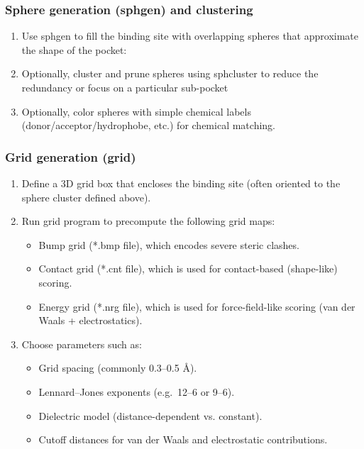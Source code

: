 \documentclass[12pt, a4paper]{article}
\begin{document}
\subsubsection{Sphere generation (sphgen) and clustering}

\begin{enumerate}
  \item Use sphgen to fill the binding site with overlapping spheres that approximate the shape of the pocket:
  \item Optionally, cluster and prune spheres using sphcluster to reduce the redundancy or focus on a particular sub-pocket
  \item Optionally, color spheres with simple chemical labels (donor/acceptor/hydrophobe, etc.) for chemical matching.
\end{enumerate}

\subsubsection{Grid generation (grid)}

\begin{enumerate}
  \item Define a 3D grid box that encloses the binding site (often oriented to the sphere cluster defined above).
  \item Run grid program to precompute the following grid maps:
        \begin{itemize}
          \item Bump grid (*.bmp file), which encodes severe steric clashes.
          \item Contact grid (*.cnt file), which is used for contact-based (shape-like) scoring.
          \item Energy grid (*.nrg file), which is used for force-field-like scoring (van der Waals + electrostatics).
        \end{itemize}

  \item Choose parameters such as:
        \begin{itemize}
          \item Grid spacing (commonly 0.3–0.5 \r{A}).
          \item Lennard–Jones exponents (e.g.\ 12–6 or 9–6).
          \item Dielectric model (distance-dependent vs. constant).
          \item Cutoff distances for van der Waals and electrostatic contributions.
        \end{itemize}
\end{enumerate}
\end{document}
